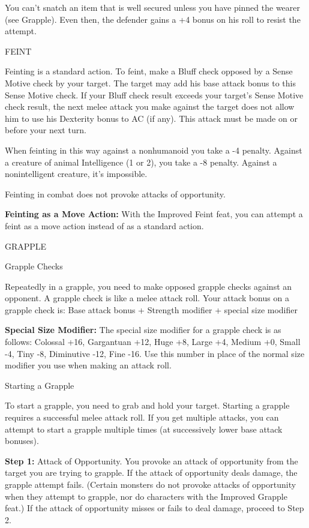\documentclass{article}
\begin{document}
You can't snatch an item that is well secured unless you have pinned the wearer 
(see Grapple). Even then, the defender gains a +4 bonus on his roll to resist the 
attempt.

\vspace{12pt}
FEINT

Feinting is a standard action. To feint, make a Bluff check opposed by a Sense 
Motive check by your target. The target may add his base attack bonus to this Sense 
Motive check. If your Bluff check result exceeds your target's Sense Motive check 
result, the next melee attack you make against the target does not allow him to 
use his Dexterity bonus to AC (if any). This attack must be made on or before your 
next turn.

When feinting in this way against a nonhumanoid you take a -4 penalty. Against 
a creature of animal Intelligence (1 or 2), you take a -8 penalty. Against a nonintelligent 
creature, it's impossible.

Feinting in combat does not provoke attacks of opportunity.

\textbf{Feinting as a Move Action:} With the Improved Feint feat, you can attempt 
a feint as a move action instead of as a standard action.

\vspace{12pt}
GRAPPLE

\vspace{12pt}
Grapple Checks

Repeatedly in a grapple, you need to make opposed grapple checks against an opponent. 
A grapple check is like a melee attack roll. Your attack bonus on a grapple check 
is: Base attack bonus + Strength modifier + special size modifier

\textbf{Special Size Modifier:} The special size modifier for a grapple check is 
as follows: Colossal +16, Gargantuan +12, Huge +8, Large +4, Medium +0, Small -4, 
Tiny -8, Diminutive -12, Fine -16. Use this number in place of the normal size 
modifier you use when making an attack roll.

\vspace{12pt}
Starting a Grapple

To start a grapple, you need to grab and hold your target. Starting a grapple requires 
a successful melee attack roll. If you get multiple attacks, you can attempt to 
start a grapple multiple times (at successively lower base attack bonuses).

\textbf{Step 1:} Attack of Opportunity. You provoke an attack of opportunity from 
the target you are trying to grapple. If the attack of opportunity deals damage, 
the grapple attempt fails. (Certain monsters do not provoke attacks of opportunity 
when they attempt to grapple, nor do characters with the Improved Grapple feat.) 
If the attack of opportunity misses or fails to deal damage, proceed to Step 2.
\end{document}
